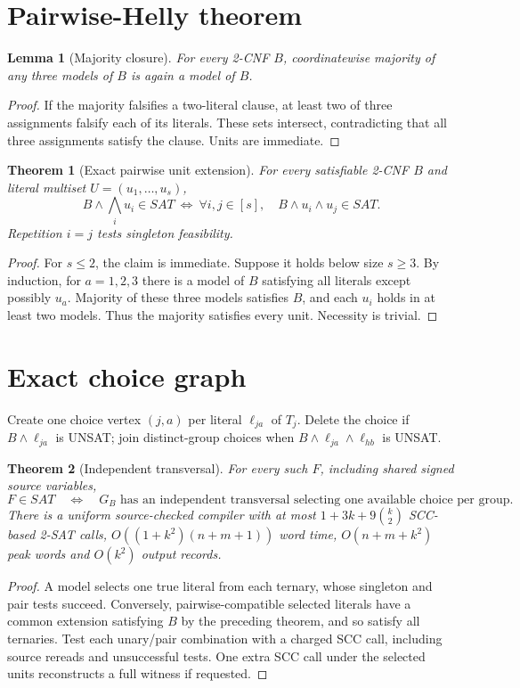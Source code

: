 \documentclass[10pt]{article}
\newtheorem{theorem}{Theorem}
\newtheorem{lemma}{Lemma}
\begin{document}
\section{Pairwise-Helly theorem}
\begin{lemma}[Majority closure]
For every 2-CNF $B$, coordinatewise majority of any three models of $B$ is again a model of $B$.
\end{lemma}
\begin{proof}
If the majority falsifies a two-literal clause, at least two of three assignments falsify each of its literals. These sets intersect, contradicting that all three assignments satisfy the clause. Units are immediate.
\end{proof}
\begin{theorem}[Exact pairwise unit extension]
For every satisfiable 2-CNF $B$ and literal multiset $U=(u_1,\ldots,u_s)$,
\[
B\land\bigwedge_i u_i\in SAT
\ \Longleftrightarrow\
\forall i,j\in[s],\quad B\land u_i\land u_j\in SAT.
\]
Repetition $i=j$ tests singleton feasibility.
\end{theorem}
\begin{proof}
For $s\le2$, the claim is immediate. Suppose it holds below size $s\ge3$. By induction, for $a=1,2,3$ there is a model of $B$ satisfying all literals except possibly $u_a$. Majority of these three models satisfies $B$, and each $u_i$ holds in at least two models. Thus the majority satisfies every unit. Necessity is trivial.
\end{proof}

\section{Exact choice graph}
Create one choice vertex $(j,a)$ per literal $\ell_{ja}$ of $T_j$. Delete the choice if $B\land\ell_{ja}$ is UNSAT; join distinct-group choices when $B\land\ell_{ja}\land\ell_{hb}$ is UNSAT.
\begin{theorem}[Independent transversal]
For every such $F$, including shared signed source variables,
\[
F\in SAT\quad\Longleftrightarrow\quad
G_B\text{ has an independent transversal selecting one available choice per group}.
\]
There is a uniform source-checked compiler with at most
$1+3k+9\binom{k}{2}$ SCC-based 2-SAT calls,
$O((1+k^2)(n+m+1))$ word time, $O(n+m+k^2)$ peak words and $O(k^2)$ output records.
\end{theorem}
\begin{proof}
A model selects one true literal from each ternary, whose singleton and pair tests succeed. Conversely, pairwise-compatible selected literals have a common extension satisfying $B$ by the preceding theorem, and so satisfy all ternaries. Test each unary/pair combination with a charged SCC call, including source rereads and unsuccessful tests. One extra SCC call under the selected units reconstructs a full witness if requested.
\end{proof}
\end{document}
